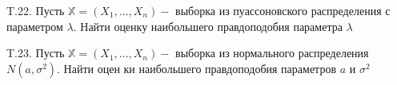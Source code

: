 \documentclass[a4paper,12pt]{article} %
\begin{document}
\begin{example}

T.22. Пусть $\mathbb{X}=\left(X_{1}, \ldots, X_{n}\right)-$ выборка из пуассоновского распределения
с параметром $\lambda .$ Найти оценку наибольшего правдоподобия параметра
$\lambda$




\end{example}



\begin{example}

T.23. Пусть $\mathbb{X}=\left(X_{1}, \ldots, X_{n}\right)-$ выборка из нормального распределения $N\left(a, \sigma^{2}\right) .$ Найти оцен ки наибольшего правдоподобия параметров $a$ и $\sigma^{2}$




\end{example}






\printindex



\end{document}

